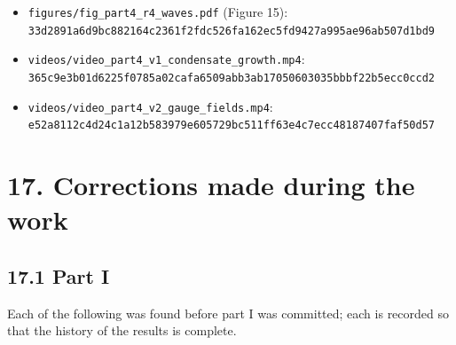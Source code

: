 \documentclass[
  10pt,
]{article}
\begin{document}
\begin{itemize}
  \texttt{figures/fig\_part4\_r3\_modes.pdf} (Figure 14):\\
  \texttt{d7cc1802f966287a371b23c0099d38dcec18f794cd5815c962722adabc8418ec}
\item
  \texttt{figures/fig\_part4\_r4\_waves.pdf} (Figure 15):\\
  \texttt{33d2891a6d9bc882164c2361f2fdc526fa162ec5fd9427a995ae96ab507d1bd9}
\item
  \texttt{videos/video\_part4\_v1\_condensate\_growth.mp4}:\\
  \texttt{365c9e3b01d6225f0785a02cafa6509abb3ab17050603035bbbf22b5ecc0ccd2}
\item
  \texttt{videos/video\_part4\_v2\_gauge\_fields.mp4}:\\
  \texttt{e52a8112c4d24c1a12b583979e605729bc511ff63e4c7ecc48187407faf50d57}
\end{itemize}

\hypertarget{corrections-made-during-the-work}{%
\section{17. Corrections made during the
work}\label{corrections-made-during-the-work}}

\hypertarget{part-i}{%
\subsection{17.1 Part I}\label{part-i}}

Each of the following was found before part I was committed; each is
recorded so that the history of the results is complete.
\end{document}
